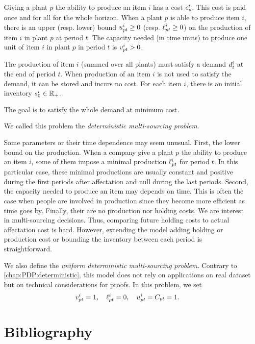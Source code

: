 Giving a plant $p$ the ability to produce an item $i$ has a cost $c_p^i$.
This cost is paid once and for all for the whole horizon.
When a plant $p$ is able to produce item $i$, there is an upper (resp. lower) bound $u_{pt}^i\ge 0$ (resp. $\ell_{pt}^i\ge 0$) on the production of item $i$ in plant $p$ at period $t$.
The capacity needed (in time units) to produce one unit of item $i$ in plant $p$ in period $t$ is $v_{pt}^i>0$.


The production of item $i$ (summed over all plants) must satisfy a demand $d_t^i$ at the end of period $t$.
When production of an item $i$ is not used to satisfy the demand, it can be stored and incurs no cost.
For each item $i$, there is an initial inventory $s_0^i\in\mathbb{R}_+$.


The goal is to satisfy the whole demand at minimum cost.


We called this problem the \emph{deterministic multi-sourcing problem}.


\medskip


Some parameters or their time dependence may seem unusual.
First, the lower bound on the production.
When a company give a plant $p$ the ability to produce an item $i$, some of them impose a minimal production $\ell_{pt}^i$ for period $t$.
In this particular case, these minimal productions are usually constant and positive during the first periods after affectation and null during the last periods.
Second, the capacity needed to produce an item may depends on time.
This is often the case when people are involved in production since they become more efficient as time goes by.
Finally, their are no production nor holding costs.
We are interest in multi-sourcing decisions.
Thus, comparing future holding costs to actual affectation cost is hard.
However, extending the model adding holding or production cost or bounding the inventory between each period is straightforward.


\medskip


We also define the \emph{uniform deterministic multi-sourcing problem}. Contrary to \cref{chap:PDP:deterministic}, this model does not rely on applications on real dataset but on technical considerations for proofs. In this problem, we set
$$
v_{pt}^i = 1
,\quad
\ell_{pt}^i = 0
,\quad
u_{pt}^i = C_{pt} = 1
.
$$


\section{Bibliography}




